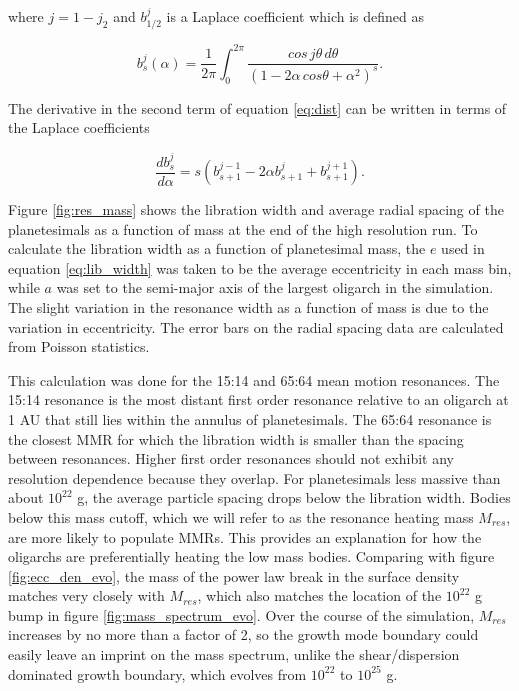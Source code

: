 \noindent \cite{winter97} where $j = 1 - j_{2}$ and $b_{1/2}^{j}$ is a Laplace coefficient which is defined as

\begin{equation}\label{eq:lap}
b_{s}^{j}(\alpha) = \frac{1}{2 \pi} \int_{0}^{2 \pi} \frac{cos \, j \theta \, d \theta}{\left( 1 - 2 \alpha \, cos \theta + \alpha^2 \right)^{s}}.
\end{equation}

\noindent The derivative in the second term of equation \ref{eq:dist} can be written in terms of the Laplace coefficients 
\cite{murray00}

\begin{equation}\label{eq:lap_d}
\frac{d b_{s}^{j}}{d \alpha} = s \left( b_{s+1}^{j-1} - 2 \alpha b_{s+1}^{j} + b_{s+1}^{j+1} \right).
\end{equation}

Figure \ref{fig:res_mass} shows the libration width and average radial spacing of the planetesimals as a function of mass at the 
end of the high resolution run. To calculate the libration width as a function of planetesimal mass, the $e$ used in equation 
\ref{eq:lib_width} was taken to be the average eccentricity in each mass bin, while $a$ was set to the semi-major axis of the 
largest oligarch in the simulation. The slight variation in the resonance width as a function of mass is due to the variation in 
eccentricity. The error bars on the radial spacing data are calculated from Poisson statistics.

This calculation was done for the 15:14 and 65:64 mean motion resonances. The 15:14 resonance is the most distant first order 
resonance relative to an oligarch at 1 AU that still lies within the annulus of planetesimals. The 65:64 resonance is the closest 
MMR for which the libration width is smaller than the spacing between resonances. Higher first order resonances should not 
exhibit any resolution dependence because they overlap. For planetesimals less massive than about $10^{22}$ g, the average 
particle spacing drops below the libration width. Bodies below this mass cutoff, which we will refer to as the resonance heating 
mass $M_{res}$, are more likely to populate MMRs. This provides an explanation for how the oligarchs are preferentially heating 
the low mass bodies. Comparing with figure \ref{fig:ecc_den_evo}, the mass of the power law break in the surface density 
matches very closely with $M_{res}$, which also matches the location of the $10^{22}$ g bump in figure 
\ref{fig:mass_spectrum_evo}. Over the course of the simulation, $M_{res}$ increases by no more than a factor of 2, so the 
growth mode boundary could easily leave an imprint on the mass spectrum, unlike the shear/dispersion dominated growth 
boundary, which evolves from $10^{22}$ to $10^{25}$ g.

